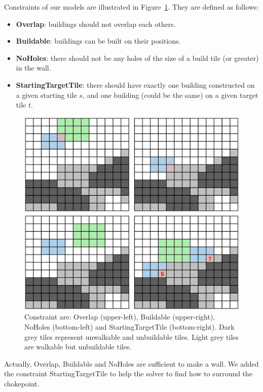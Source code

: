 \documentclass[journal]{IEEEtran}
\begin{document}
Constraints     of      our     models     are      illustrated     in
Figure~\ref{fig:wall_constraint}. They are defined as follows:
\begin{itemize}
\item {\bf Overlap}: buildings should not overlap each others.
\item {\bf Buildable}: buildings can be built on their positions.
\item {\bf NoHoles}: there should not be any holes of the size of a
  build tile (or greater) in the wall.
\item {\bf StartingTargetTile}: there should have exactly one building
  constructed on a given starting tile $s$, and one building (could be the
  same) on a given target tile $t$.
\end{itemize}
\begin{figure}[htb]
  \centering
  \includegraphics[width=\columnwidth]{figs/all_constraints.png}
  \caption{Constraint    are:    Overlap    (upper-left),    Buildable
    (upper-right),   NoHoles   (bottom-left)  and   StartingTargetTile
    (bottom-right).    Dark  grey   tiles  represent   unwalkable  and
    unbuildable tiles.  Light grey  tiles are walkable but unbuildable
    tiles.}
  \label{fig:wall_constraint}
\end{figure}
Actually,  Overlap, Buildable  and NoHoles  are sufficient  to make  a
wall. We added the constraint StartingTargetTile to help the solver to
find how to surround the chokepoint.
\end{document}
